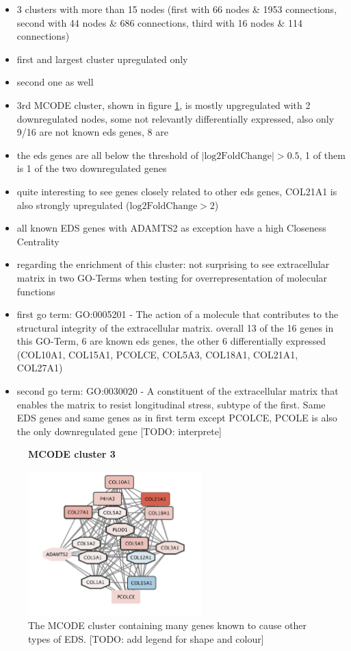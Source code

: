 \begin{itemize}
	\item 3 clusters with more than 15 nodes (first with 66 nodes \& 1953 connections, second with 44 nodes \& 686 connections, third with 16 nodes \& 114 connections)
	\item first and largest cluster upregulated only
	\item second one as well
	\item 3rd MCODE cluster, shown in figure \ref{fig:mcode3}, is mostly upgregulated with 2 downregulated nodes, some not relevantly differentially expressed, also only 9/16 are not known eds genes, 8 are
	\item the eds genes are all below the threshold of $|\text{log2FoldChange}| > 0.5$, 1 of them is 1 of the two downregulated genes
	\item quite interesting to see genes closely related to other eds genes, COL21A1 is also strongly upregulated ($\text{log2FoldChange} > 2$)
	\item all known EDS genes with ADAMTS2 as exception have a high Closeness Centrality
	\item regarding the enrichment of this cluster: not surprising to see extracellular matrix in two GO-Terms when testing for overrepresentation of molecular functions
	\item first go term: GO:0005201 - The action of a molecule that contributes to the structural integrity of the extracellular matrix. overall 13 of the 16 genes in this GO-Term, 6 are known eds genes, the other 6 differentially expressed (COL10A1, COL15A1, PCOLCE, COL5A3, COL18A1, COL21A1, COL27A1)
	\item second go term: GO:0030020 - A constituent of the extracellular matrix that enables the matrix to resist longitudinal stress, subtype of the first. Same EDS genes and same genes as in first term except PCOLCE, PCOLE is also the only downregulated gene [TODO: interprete]
\end{itemize}

\begin{figure}[htb!]
	\centering
	\caption*{\textbf{MCODE cluster 3}}
	\includegraphics[width=0.6\textwidth]{fig/MCODE-cluster3.png}
	\caption[MCODE cluster 3]{\centering The MCODE cluster containing many genes known to cause other types of EDS. [TODO: add legend for shape and colour]}
	\label{fig:mcode3}
\end{figure}

